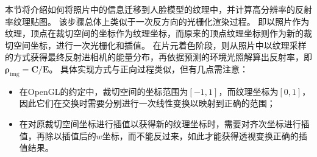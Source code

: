 本节将介绍如何将照片中的信息迁移到人脸模型的纹理中，并计算高分辨率的反射率纹理贴图。
该步骤总体上类似于一次反方向的光栅化渲染过程。
即以照片作为纹理，顶点在裁切空间的坐标作为纹理坐标，而原来的顶点纹理坐标则作为新的裁切空间坐标，进行一次光栅化和插值。
在片元着色阶段，则从照片中以纹理采样的方式获得最终反射进相机的能量分布，再依据预测的环境光照解算出反射率，即$\mathbf{\rho}_\mathrm{img} = \mathbf{C} / \mathbf{E}$。
具体实现方式与正向过程类似，但有几点需注意：
\begin{itemize}
\item 在OpenGL的约定中，裁切空间的坐标范围为$[-1,1]$，而纹理坐标为$[0,1]$，因此它们在交换时需要分别进行一次线性变换以映射到正确的范围；
\item 在对原裁切空间坐标进行插值以获得新的纹理坐标时，需要对齐次坐标进行插值，再除以插值后的$w$坐标，而不能反过来，如此才能获得透视变换正确的插值结果。
\end{itemize}

